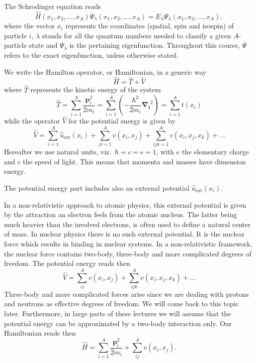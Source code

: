 \documentclass[graybox,sectrefs,envcountresetchap,open=right]{svmonodo}
\begin{document}
The Schrodinger equation reads 
\begin{equation}
\hat{H}(x_1, x_2, \dots , x_A) \Psi_{\lambda}(x_1, x_2, \dots , x_A) = 
E_\lambda  \Psi_\lambda(x_1, x_2, \dots , x_A), \label{eq:basicSE1}
\end{equation}
where the vector $x_i$ represents the coordinates (spatial, spin and isospin) of particle $i$, $\lambda$ stands  for all the quantum
numbers needed to classify a given $A$-particle state and $\Psi_{\lambda}$ is the pertaining eigenfunction.  Throughout this course,
$\Psi$ refers to the exact eigenfunction, unless otherwise stated.


We write the Hamilton operator, or Hamiltonian,  in a generic way 
\[
	\hat{H} = \hat{T} + \hat{V} 
\]
where $\hat{T}$  represents the kinetic energy of the system
\[
	\hat{T} = \sum_{i=1}^A \frac{\mathbf{p}_i^2}{2m_i} = \sum_{i=1}^A \left( -\frac{\hbar^2}{2m_i} \mathbf{\nabla_i}^2 \right) =
		\sum_{i=1}^A t(x_i)
\]
while the operator $\hat{V}$ for the potential energy is given by
\begin{equation}
	\hat{V} = \sum_{i=1}^A \hat{u}_{\mathrm{ext}}(x_i) + \sum_{ji=1}^A v(x_i,x_j)+\sum_{ijk=1}^Av(x_i,x_j,x_k)+\dots
\label{eq:firstv}
\end{equation}
Hereafter we use natural units, viz.~$\hbar=c=e=1$, with $e$ the elementary charge and $c$ the speed of light. This means that momenta and masses
have dimension energy. 


The potential energy part includes also an external potential $\hat{u}_{\mathrm{ext}}(x_i)$.

In a non-relativistic approach to atomic  physics, this external potential is given by the attraction an electron feels from the atomic nucleus. The latter being much heavier than the involved electrons, is often used to define a natural center of mass. In nuclear physics there is no such external potential. It is the nuclear force which results in binding in nuclear systems. In a non-relativistic framework, the nuclear force contains two-body, three-body and more complicated degrees of freedom. The potential energy reads then  
\[
	\hat{V} = \sum_{ij}^A v(x_i,x_j)+\sum_{ijk}^Av(x_i,x_j,x_k)+\dots
\]
Three-body and more  complicated forces arise since we are dealing with protons and neutrons as effective degrees of freedom. We will come back to this topic later. Furthermore, in large parts of these lectures we will assume that the potential energy can be approximated by a two-body interaction only. Our Hamiltonian reads then
\begin{equation}
	\hat{H} = \sum_{i=1}^A \frac{\mathbf{p}_i^2}{2m_i}+\sum_{ij}^A v(x_i,x_j).
\label{eq:firstH}
\end{equation}
\end{document}
